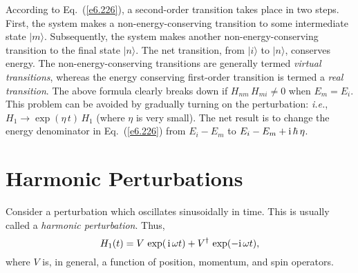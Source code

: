 According to Eq.~(\ref{e6.226}), a second-order transition takes place in
two steps. First, the system makes a non-energy-conserving transition to
some intermediate state $|m\rangle$. Subsequently,  the system makes another
non-energy-conserving transition to the final state $|n\rangle$. The net
transition, from $|i\rangle$ to $|n\rangle$, conserves energy. The
non-energy-conserving transitions are generally termed {\em virtual
transitions}, whereas the energy conserving first-order transition
is termed a {\em real transition}. The above formula clearly breaks down
if $H_{nm}\,H_{mi}\neq 0$ when $E_m =  E_i$. This problem can be avoided by
gradually turning on the perturbation: {\em i.e.}, $H_1\rightarrow \exp(\eta\,t)\,
H_1$ (where $\eta$ is very small). The net result is to change the energy
denominator in Eq.~(\ref{e6.226}) from $E_i-E_m$ to $E_i - 
E_m +{\rm i}\,\hbar\,\eta$. 

\section{Harmonic Perturbations}
Consider a  perturbation which oscillates sinusoidally in time.
This is usually called a {\em harmonic perturbation}. Thus,
\begin{equation}\label{e6.227}
H_1(t) = V\,\exp(\,{\rm i}\,\omega t) + V^\dagger \,\exp(-{\rm i}\,\omega t),
\end{equation}
where $V$ is, in general, a function of  position, momentum, and
spin operators. 

